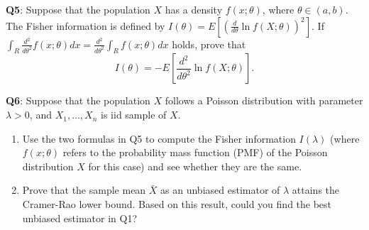 \documentclass[]{article}
\begin{document}
\textbf{Q5}: Suppose that the population \(X\) has a density
\(f(x;\theta)\), where \(\theta\in (a,b)\). The Fisher information is
defined by \(I(\theta) = E[(\frac{d}{d\theta}\ln f(X;\theta))^2]\). If
\(\int_R\frac{d^2}{d\theta^2} f(x;\theta)d x = \frac{d^2}{d\theta^2}\int_R f(x;\theta)d x\)
holds, prove that
\[I(\theta)= -E\left[\frac{d^2}{d\theta^2} \ln f(X;\theta)\right].\]

\textbf{Q6}: Suppose that the population \(X\) follows a Poisson
distribution with parameter \(\lambda>0\), and \(X_1,\dots, X_n\) is iid
sample of \(X\).

\begin{enumerate}
\def\labelenumi{\arabic{enumi}.}
\item
  Use the two formulas in Q5 to compute the Fisher information
  \(I(\lambda)\) (where \(f(x;\theta)\) refers to the probability mass
  function (PMF) of the Poisson distribution \(X\) for this case) and
  see whether they are the same.
\item
  Prove that the sample mean \(\bar X\) as an unbiased estimator of
  \(\lambda\) attains the Cramer-Rao lower bound. Based on this result,
  could you find the best unbiased estimator in Q1?
\end{enumerate}
\end{document}
